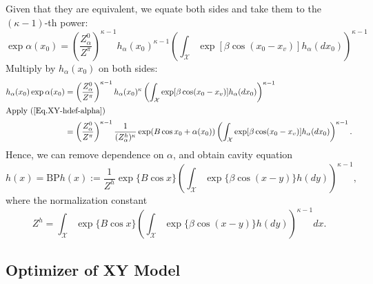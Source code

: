 \documentclass[12pt]{article}
\numberwithin{equation}{section}
\begin{document}
Given that they are equivalent, we equate both sides and take them to the $(\kappa-1)$-th power:
\begin{equation*}
    \exp\alpha(x_0) = \left(\frac{Z^0_\alpha}{Z^\pi}\right)^{\kappa-1}h_\alpha(x_0)^{\kappa-1}\left(\int_{\mathcal{X}}\exp[\beta\cos(x_0-x_v)]h_\alpha(dx_0)\right)^{\kappa-1}
\end{equation*}
Multiply by $h_\alpha(x_0)$ on both sides:
\begin{align*}
    h_\alpha(x_0)\exp\alpha(x_0) & = \left(\frac{Z^0_\alpha}{Z^\pi}\right)^{\kappa-1}h_\alpha(x_0)^\kappa\left(\int_{\mathcal{X}}\exp[\beta\cos(x_0-x_v)]h_\alpha(dx_0)\right)^{\kappa-1}                                        \\
    \intertext{Apply (\ref{Eq.XY-hdef-alpha})}
                                 & = \left(\frac{Z^0_\alpha}{Z^\pi}\right)^{\kappa-1}\frac{1}{(Z^h_\alpha)^\kappa}\exp(B\cos x_0 + \alpha(x_0))\left(\int_{\mathcal{X}}\exp[\beta\cos(x_0-x_v)]h_\alpha(dx_0)\right)^{\kappa-1}.
\end{align*}
Hence, we can remove dependence on $\alpha$, and obtain cavity equation
\begin{equation}
    h(x) = \text{BP}h(x) := \frac{1}{Z^h}\exp\{B\cos x\}\left(\int_{\mathcal{X}}\exp\{\beta\cos(x-y)\}h(dy)\right)^{\kappa-1},
    \label{Eq.XY-cavity-equation}
\end{equation}
where the normalization constant
\begin{equation}
    \label{Eq.XY-Zh}
    Z^h = \int_{\mathcal{X}} \exp\{B\cos x\}\left(\int_{\mathcal{X}}\exp\{\beta\cos(x-y)\}h(dy)\right)^{\kappa-1} dx.
\end{equation}

\newpage

\subsection{Optimizer of XY Model}
\end{document}
